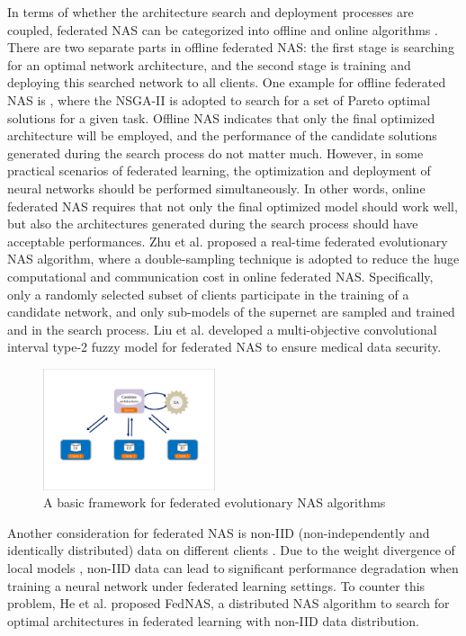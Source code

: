 \documentclass[journal]{IEEEtran}
\begin{document}
In terms of whether the architecture search and deployment processes are coupled, federated NAS can be categorized into offline and online algorithms \cite{zhu2021from}. There are two separate parts in offline federated NAS: the first stage is searching for an optimal network architecture, and the second stage is training and deploying this searched network to all clients. One example for offline federated NAS is \cite{zhu2019multi}, where the NSGA-II \cite{deb2002fast} is adopted to search for a set of Pareto optimal solutions for a given task. Offline NAS indicates that only the final optimized architecture will be employed, and the performance of the candidate solutions generated during the search process do not matter much. However, in some practical scenarios of federated learning, the optimization and deployment of neural networks should be performed simultaneously. In other words, online federated NAS requires that not only the final optimized model should work well, but also the architectures generated during the search process should have acceptable performances. Zhu et al. \cite{zhu2021real} proposed a real-time federated evolutionary NAS algorithm, where a double-sampling technique is adopted to reduce the huge computational and communication cost in online federated NAS. Specifically, only a randomly selected subset of clients participate in the training of a candidate network, and only sub-models of the supernet are sampled and trained and in the search process. Liu et al. \cite{liu2022federated} developed a multi-objective convolutional interval type-2 fuzzy model for federated NAS to ensure medical data security.

\begin{figure}[H]
\centering %
\includegraphics[width=0.45\textwidth]{fed_evo_nas.pdf} %
\caption{A basic framework for federated evolutionary NAS algorithms} %
\label{Fig_7}
\end{figure}

Another consideration for federated NAS is non-IID (non-independently and identically distributed) data on different clients \cite{zhu2021federated}. Due to the weight divergence of local models \cite{zhao2018federated}, non-IID data can lead to significant performance degradation when training a neural network under federated learning settings. To counter this problem, He et al. \cite{he2020towards} proposed FedNAS, a distributed NAS algorithm to search for optimal architectures in federated learning with non-IID data distribution. 
\end{document}
